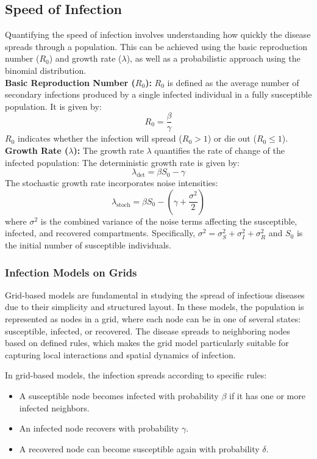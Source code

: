 \subsection{Speed of Infection}
Quantifying the speed of infection involves understanding how quickly the disease spreads through a population. This can be achieved using the basic reproduction number ($R_0$) and growth rate ($\lambda$), as well as a probabilistic approach using the binomial distribution.\\

\noindent
\textbf{Basic Reproduction Number ($R_0$):} $R_0$ is defined as the average number of secondary infections produced by a single infected individual in a fully susceptible population. It is given by:
\begin{equation}
R_0 = \frac{\beta}{\gamma}
\end{equation}
$R_0$ indicates whether the infection will spread ($R_0 > 1$) or die out ($R_0 \leq 1$).\\

\noindent
\textbf{Growth Rate ($\lambda$):} The growth rate $\lambda$ quantifies the rate of change of the infected population:
\noindent
The deterministic growth rate is given by:
\[ \lambda_{\text{det}} = \beta S_0 - \gamma \]
The stochastic growth rate incorporates noise intensities:
\[ \lambda_{\text{stoch}} = \beta S_0 - \left(\gamma + \frac{\sigma^2}{2}\right) \]
\noindent
where \(\sigma^2\) is the combined variance of the noise terms affecting the susceptible, infected, and recovered compartments. Specifically, \(\sigma^2 = \sigma_S^2 + \sigma_I^2 + \sigma_R^2\) and $S_0$ is the initial number of susceptible individuals.

\subsubsection{Infection Models on Grids}
\label{section:infection_probabilities}
Grid-based models are fundamental in studying the spread of infectious diseases due to their simplicity and structured layout. In these models, the population is represented as nodes in a grid, where each node can be in one of several states: susceptible, infected, or recovered. The disease spreads to neighboring nodes based on defined rules, which makes the grid model particularly suitable for capturing local interactions and spatial dynamics of infection.

\noindent
In grid-based models, the infection spreads according to specific rules:
\begin{itemize}
    \item A susceptible node becomes infected with probability \(\beta\) if it has one or more infected neighbors.
    \item An infected node recovers with probability \(\gamma\).
    \item A recovered node can become susceptible again with probability \(\delta\).
\end{itemize}

